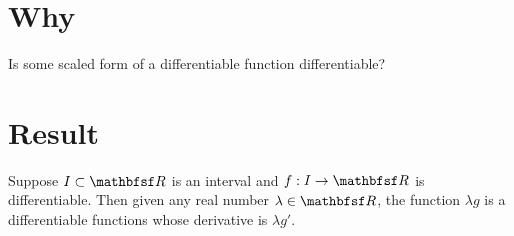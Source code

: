 
\section*{Why}

Is some scaled form of a differentiable function differentiable?

\section*{Result}

\begin{proposition}
Suppose $I \subset \R $ is an interval and $f: I \to \R $ is differentiable.
Then given any real number $\lambda  \in \R $, the function $\lambda g$ is a differentiable functions whose derivative is $\lambda g'$.
\end{proposition}

\blankpage